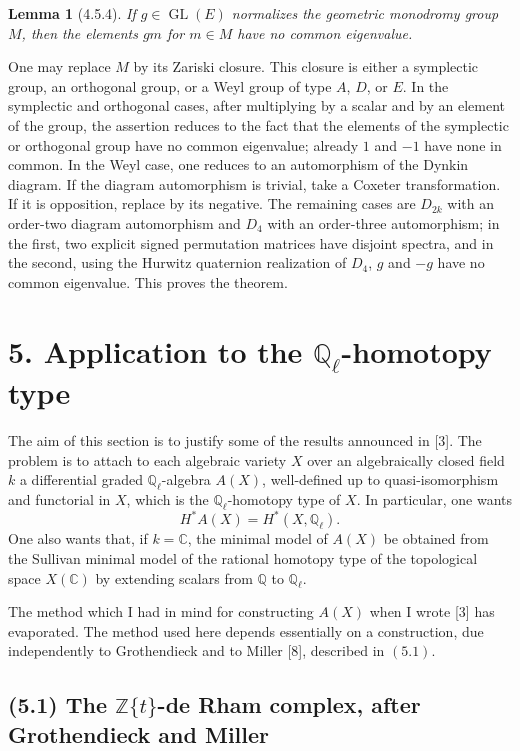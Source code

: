 \documentclass[11pt]{article}
\newtheorem{lemma}{Lemma}
\theoremstyle{remark}
\newcommand{\Ql}{\mathbb{Q}_\ell}
\newcommand{\QQ}{\mathbb{Q}}
\newcommand{\CC}{\mathbb{C}}
\begin{document}
\begin{lemma}[4.5.4]
If $g\in\operatorname{GL}(E)$ normalizes the geometric monodromy group $M$, then the elements $gm$ for $m\in M$ have no common eigenvalue.
\end{lemma}

One may replace $M$ by its Zariski closure. This closure is either a symplectic group, an orthogonal group, or a Weyl group of type $A$, $D$, or $E$. In the symplectic and orthogonal cases, after multiplying by a scalar and by an element of the group, the assertion reduces to the fact that the elements of the symplectic or orthogonal group have no common eigenvalue; already $1$ and $-1$ have none in common. In the Weyl case, one reduces to an automorphism of the Dynkin diagram. If the diagram automorphism is trivial, take a Coxeter transformation. If it is opposition, replace by its negative. The remaining cases are $D_{2k}$ with an order-two diagram automorphism and $D_4$ with an order-three automorphism; in the first, two explicit signed permutation matrices have disjoint spectra, and in the second, using the Hurwitz quaternion realization of $D_4$, $g$ and $-g$ have no common eigenvalue. This proves the theorem.



\clearpage
\section*{5. Application to the \texorpdfstring{$\mathbb Q_\ell$}{Q_l}-homotopy type}

The aim of this section is to justify some of the results announced in [3].  The problem is to attach to each algebraic variety \(X\) over an algebraically closed field \(k\) a differential graded \(\Ql\)-algebra \(A(X)\), well-defined up to quasi-isomorphism and functorial in \(X\), which is the \(\Ql\)-homotopy type of \(X\).  In particular, one wants
\[
H^*A(X)=H^*(X,\Ql).
\]
One also wants that, if \(k=\CC\), the minimal model of \(A(X)\) be obtained from the Sullivan minimal model of the rational homotopy type of the topological space \(X(\CC)\) by extending scalars from \(\QQ\) to \(\Ql\).

The method which I had in mind for constructing \(A(X)\) when I wrote [3] has evaporated.  The method used here depends essentially on a construction, due independently to Grothendieck and to Miller [8], described in \((5.1)\).

\subsection*{(5.1) The \(\mathbb Z\{t\}\)-de Rham complex, after Grothendieck and Miller}
\end{document}
